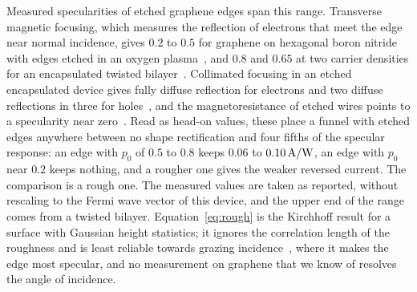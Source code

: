 Measured specularities of etched graphene edges span this range.
Transverse magnetic focusing, which measures the reflection of electrons
that meet the edge near normal incidence, gives $0.2$ to $0.5$ for
graphene on hexagonal boron nitride with edges etched in an oxygen
plasma~\cite{taychatanapat2013electrically}, and $0.8$ and $0.65$ at two
carrier densities for an encapsulated twisted
bilayer~\cite{berdyugin2020minibands}. Collimated focusing in an etched
encapsulated device gives fully diffuse
reflection for electrons and two diffuse reflections in three for
holes~\cite{barnard2017absorptive}, and the magnetoresistance of etched
wires points to a specularity near zero~\cite{masubuchi2012boundary}.
Read as head-on values, these place a funnel with etched edges anywhere
between no shape rectification and four fifths of the specular
response: an edge with $p_{0}$ of $0.5$ to $0.8$ keeps $0.06$ to
$0.10\,\mathrm{A/W}$, an edge with $p_{0}$ near $0.2$ keeps nothing, and a rougher
one gives the weaker reversed current. The comparison is a rough one.
The measured values are taken as reported, without rescaling to the
Fermi wave vector of this device, and the upper end of the range comes
from a twisted bilayer. Equation~\eqref{eq:rough} is the Kirchhoff
result for a surface with Gaussian height statistics; it ignores the
correlation length of the roughness and is least reliable towards
grazing incidence~\cite{shao2017probing}, where it makes the edge most
specular, and no measurement on graphene that we know of resolves the
angle of incidence.


